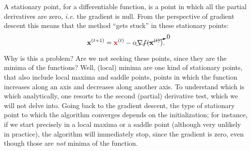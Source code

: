 
A stationary point, for a differentiable function, is a point in which all the partial derivatives are zero, \textit{i.e.} the gradient is null. From the perspective of gradient descent this means that the method ``gets stuck'' in these stationary points:
\begin{equation}
    \mathbf{x}^{(t+1)} = {\color{red}\mathbf{x}}^{(t)} - \alpha \cancelto{0}{\nabla f(\mathbf{x}^{(t)})}.
\end{equation}

Why is this a problem? Are we not seeking these points, since they are the minima of the functions? Well, (local) minima are one kind of stationary points, that also include local maxima and saddle points, points in which the function increases along an axis and decreases along another axis. To understand which is which analytically, one resorts to the second (partial) derivative test, which we will not delve into. Going back to the gradient descent, the type of stationary point to which the algorithm converges depends on the initialization; for instance, if we start precisely in a local maxima or a saddle point (although very unlikely in practice), the algorithm will immediately stop, since the gradient is zero, even though those are \textit{not} minima of the function.